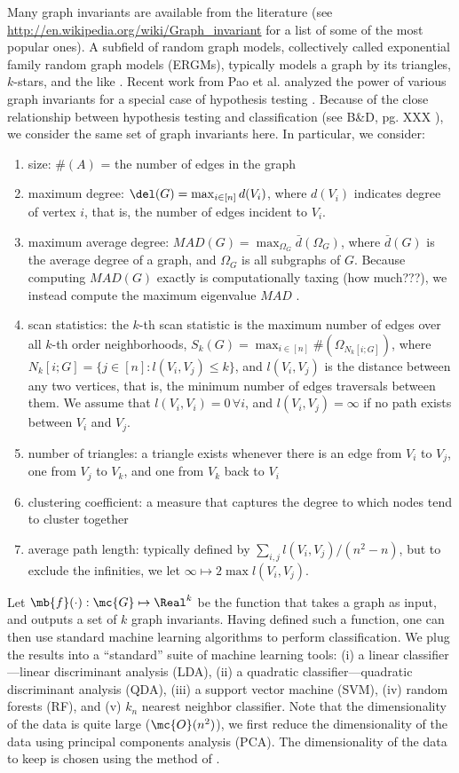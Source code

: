 Many graph invariants are available from the literature (see 
\url{http://en.wikipedia.org/wiki/Graph_invariant}
for a list of some of the most popular ones).   A subfield of random graph models, collectively called exponential family random graph models (ERGMs), typically models a graph by its triangles, $k$-stars, and the like \cite{??}.  Recent work from Pao et al. analyzed the power of various graph invariants for a special case of hypothesis testing \cite{??}.  Because of the close relationship between hypothesis testing and classification (see B\&D, pg. XXX \cite{??}), we consider the same set of graph invariants here.  In particular, we consider:
\begin{enumerate}
	\item size:  $\#(A)$ = the number of edges in the graph
	\item  maximum degree: $\del(G)= \max_{i \in [n]} d(V_i)$, where $d(V_i)$ indicates degree of vertex $i$, that is, the number of edges incident to $V_i$.
	\item maximum average degree: 	$MAD(G)=\max_{\Omega_G} \bar{d}(\Omega_G)$, where $\bar{d}(G)$ is the average degree of a graph, and $\Omega_G$ is all subgraphs of $G$.  Because computing $MAD(G)$ exactly is computationally taxing (how much???), we instead compute the maximum eigenvalue $MAD$ \cite{PaoPriebe10}.
	\item scan statistics: the $k$-th scan statistic is the maximum number of edges over all $k$-th order neighborhoods, $S_k(G) = \max_{i \in [n]} \#(\Omega_{N_k[i;G]})$, where $N_k[i;G]=\{j \in [n] : l(V_i,V_j) \leq k\}$, and $l(V_i,V_j)$ is the distance between any two vertices, that is, the minimum number of edges traversals between them.  We assume that $l(V_i,V_i)=0 \, \forall i$, and $l(V_i,V_j)=\infty$ if no path exists between $V_i$ and $V_j$.
	\item number of triangles:  a triangle exists whenever there is an edge from $V_i$ to $V_j$, one from $V_j$ to $V_k$, and one from $V_k$ back to $V_i$
	\item clustering coefficient: a measure that captures the degree to which nodes tend to cluster together
	\item average path length: typically defined by $\sum_{i,j} l(V_i,V_j)/(n^2-n)$, but to exclude the infinities, we let $\infty \mapsto 2 \max l(V_i,V_j)$.
\end{enumerate}

Let $\mb{f}(\cdot): \mc{G} \mapsto \Real^k$ be the function that takes a graph as input, and outputs a set of $k$ graph invariants.  Having defined such a function, one can then use standard machine learning algorithms to perform classification.  We plug the results into a ``standard'' suite of machine learning tools: (i) a linear classifier---linear discriminant analysis (LDA), (ii) a quadratic classifier---quadratic discriminant analysis (QDA), (iii) a support vector machine (SVM), (iv) random forests (RF), and (v) $k_n$ nearest neighbor classifier.  Note that the dimensionality of the data is quite large ($\mc{O}(n^2)$), we first reduce the dimensionality of the data using principal components analysis (PCA).  The dimensionality of the data to keep is chosen using the method of \cite{??}.



